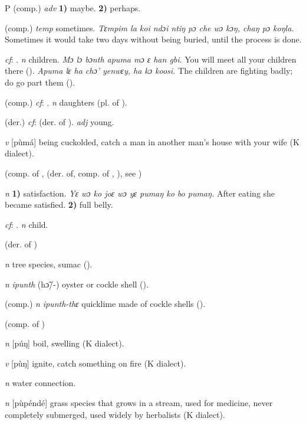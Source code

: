 \begin{letter}{P}
 (comp.) \textit{adv} \textbf{1)} maybe. \textbf{2)} perhaps.

 (comp.) \textit{temp} sometimes. \textit{Tɛmpim la koi ndɔi ntiŋ pɔ che wɔ kɔŋ, chaŋ pɔ koŋla.} Sometimes it would take two days without being buried, until the process is done.

 \textit{cf}: . \textit{n} children. \textit{Mɔ lɔ bɔnth apuma mɔ ɛ han gbi}. You will meet all your children there (\citealt{Pichl1967}). \textit{Apuma lɛ ha chɔ' yenwɛy, ha kɔ koosi.} The children are fighting badly; do go part them (\citealt{Pichl1967}). 

 (comp.) \textit{cf}: . \textit{n} daughters (pl. of ).

 (der.) \textit{cf}:  (der. of ). \textit{adj} young. 

\textit{v} [pùmá] being cuckolded, catch a man in another man's house with your wife (K dialect). 

 (comp. of ,  (der. of, comp. of , ), see ) 

 \textit{n} \textbf{1)} satisfaction. \textit{Yɛ wɔ ko joɛ wɔ yɛ pumaŋ ko bo pumaŋ.} After eating she became satisfied. \textbf{2)} full belly.

 \textit{cf}: . \textit{n} child. 

 (der. of ) 

 \textit{n} tree species, sumac (\citealt{Pichl1967}). 

 \textit{n} \textit{ipunth} (hɔ̃/-) oyster or cockle shell (\citealt{Pichl1967}).

 (comp.) \textit{n} \textit{ipunth-thɛ} quicklime made of cockle shells (\citealt{Pichl1967}). 

 (comp. of ) 

 \textit{n} [púŋ] boil, swelling (K dialect). 

 \textit{v} [pùŋ] ignite, catch something on fire (K dialect). 

 \textit{n} water connection.

 \textit{n} [pùpéndé] grass species that grows in a stream, used for medicine, never completely submerged, used widely by herbalists (K dialect).


\end{letter}
